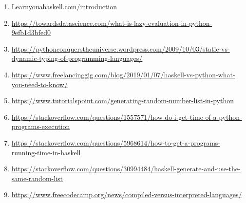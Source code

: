 \documentclass{article}
\begin{document}
\begin{enumerate}
\item \href {http://learnyouahaskell.com/introduction}{Learnyouahaskell.com/introduction}
\item \href {https://towardsdatascience.com/what-is-lazy-evaluation-in-python-9efb1d3bfed0} {https://towardsdatascience.com/what-is-lazy-evaluation-in-python-9efb1d3bfed0}
\item \href {https://pythonconquerstheuniverse.wordpress.com/2009/10/03/static-vs-dynamic-typing-of-programming-languages/} {https://pythonconquerstheuniverse.wordpress.com/2009/10/03/static-vs-dynamic-typing-of-programming-languages/}
\item\href {https://www.freelancinggig.com/blog/2019/01/07/haskell-vs-python-what-you-need-to-know/}{https://www.freelancinggig.com/blog/2019/01/07/haskell-vs-python-what-you-need-to-know/}
\item\href {https://www.tutorialspoint.com/generating-random-number-list-in-python}{https://www.tutorialspoint.com/generating-random-number-list-in-python}
\item\href{https://stackoverflow.com/questions/1557571/how-do-i-get-time-of-a-python-programs-execution}{https://stackoverflow.com/questions/1557571/how-do-i-get-time-of-a-python-programs-execution}
\item\href{https://stackoverflow.com/questions/5968614/how-to-get-a-programs-running-time-in-haskell}{https://stackoverflow.com/questions/5968614/how-to-get-a-programs-running-time-in-haskell}
\item\href{https://stackoverflow.com/questions/30994484/haskell-generate-and-use-the-same-random-list}{https://stackoverflow.com/questions/30994484/haskell-generate-and-use-the-same-random-list}
\item\href{https://www.freecodecamp.org/news/compiled-versus-interpreted-languages/}{https://www.freecodecamp.org/news/compiled-versus-interpreted-languages/}
\end{enumerate}
\end{document}
